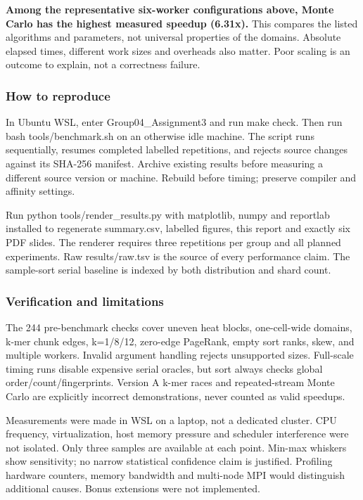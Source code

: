 \documentclass[11pt,a4paper]{article}
\begin{document}
\textbf{Among the representative six-worker configurations above, Monte Carlo has the highest measured speedup (6.31x).} This compares the listed algorithms and parameters, not universal properties of the domains. Absolute elapsed times, different work sizes and overheads also matter. Poor scaling is an outcome to explain, not a correctness failure.


\subsubsection*{How to reproduce}

In Ubuntu WSL, enter Group04\_\allowbreak{}Assignment3 and run make check. Then run bash tools/\allowbreak{}benchmark.sh on an otherwise idle machine. The script runs sequentially, resumes completed labelled repetitions, and rejects source changes against its SHA-256 manifest. Archive existing results before measuring a different source version or machine. Rebuild before timing; preserve compiler and affinity settings.


Run python tools/\allowbreak{}render\_\allowbreak{}results.py with matplotlib, numpy and reportlab installed to regenerate summary.csv, labelled figures, this report and exactly six PDF slides. The renderer requires three repetitions per group and all planned experiments. Raw results/\allowbreak{}raw.tsv is the source of every performance claim. The sample-sort serial baseline is indexed by both distribution and shard count.


\subsubsection*{Verification and limitations}

The 244 pre-benchmark checks cover uneven heat blocks, one-cell-wide domains, k-mer chunk edges, k=\allowbreak{}1/\allowbreak{}8/\allowbreak{}12, zero-edge PageRank, empty sort ranks, skew, and multiple workers. Invalid argument handling rejects unsupported sizes. Full-scale timing runs disable expensive serial oracles, but sort always checks global order/\allowbreak{}count/\allowbreak{}fingerprints. Version A k-mer races and repeated-stream Monte Carlo are explicitly incorrect demonstrations, never counted as valid speedups.


Measurements were made in WSL on a laptop, not a dedicated cluster. CPU frequency, virtualization, host memory pressure and scheduler interference were not isolated. Only three samples are available at each point. Min-max whiskers show sensitivity; no narrow statistical confidence claim is justified. Profiling hardware counters, memory bandwidth and multi-node MPI would distinguish additional causes. Bonus extensions were not implemented.
\end{document}
